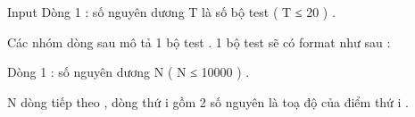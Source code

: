 Input
Dòng 1 : số nguyên dương T là số bộ test ( T ≤ 20 ) .   


   Các nhóm dòng sau mô tả 1 bộ test . 1 bộ test sẽ có format như sau :   


   Dòng 1 : số nguyên dương N (  N ≤ 10000 ) .   


   N dòng tiếp theo , dòng thứ i gồm 2 số nguyên là toạ độ của điểm thứ i .